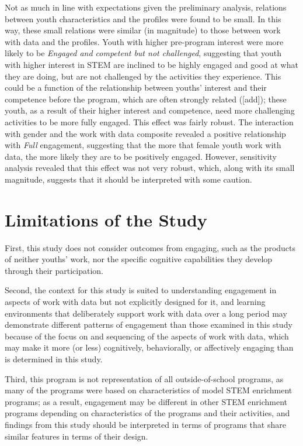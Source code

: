 \documentclass[]{book}
\theoremstyle{definition}
\theoremstyle{definition}
\theoremstyle{definition}
\theoremstyle{remark}
\begin{document}
Not as much in line with expectations given the preliminary analysis,
relations between youth characteristics and the profiles were found to
be small. In this way, these small relations were similar (in magnitude)
to those between work with data and the profiles. Youth with higher
pre-program interest were more likely to be \emph{Engaged and competent
but not challenged}, suggesting that youth with higher interest in STEM
are inclined to be highly engaged and good at what they are doing, but
are not challenged by the activities they experience. This could be a
function of the relationship between youths' interest and their
competence before the program, which are often strongly related
({[}add{]}); these youth, as a result of their higher interest and
competence, need more challenging activities to be more fully engaged.
This effect was fairly robust. The interaction with gender and the work
with data composite revealed a positive relationship with \emph{Full}
engagement, suggesting that the more that female youth work with data,
the more likely they are to be positively engaged. However, sensitivity
analysis revealed that this effect was not very robust, which, along
with its small magnitude, suggests that it should be interpreted with
some caution.

\section{Limitations of the Study}\label{limitations-of-the-study}

First, this study does not consider outcomes from engaging, such as the
products of neither youths' work, nor the specific cognitive
capabilities they develop through their participation.

Second, the context for this study is suited to understanding engagement
in aspects of work with data but not explicitly designed for it, and
learning environments that deliberately support work with data over a
long period may demonstrate different patterns of engagement than those
examined in this study because of the focus on and sequencing of the
aspects of work with data, which may make it more (or less) cognitively,
behaviorally, or affectively engaging than is determined in this study.

Third, this program is not representation of all outside-of-school
programs, as many of the programs were based on characteristics of model
STEM enrichment programs; as a result, engagement may be different in
other STEM enrichment programs depending on characteristics of the
programs and their activities, and findings from this study should be
interpreted in terms of programs that share similar features in terms of
their design.
\end{document}
